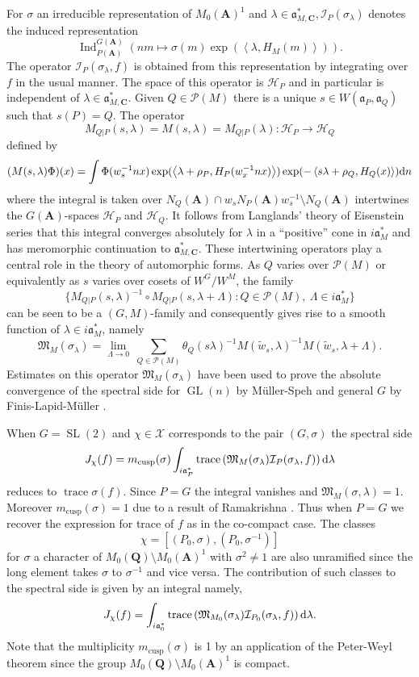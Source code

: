 \documentclass[11pt]{amsart}
\def\A{\mathbf A}
\def\C{\mathbf C}
\def\Q{\mathbf Q}
\def\HHH{\mathcal H}
\def\III{\mathcal I}
\def\MMM{\mathfrak M}	%
\def\PPP{\mathcal P}
\def\XXX{\mathcal X}
\def\aaa{\mathfrak a}
\def\cb#1{{\color{blue}#1}}
\def\d{\text d}
\def\bs{\setminus} 			%
\def\gl{\operatorname{GL}}
\def\Ind{\operatorname{Ind}}
\def\sl{\operatorname{SL}}
\def\sprod#1#2{\left\langle #1 , #2 \right\rangle}  %
\def\trace{\operatorname{trace}}
\theoremstyle{remark}
\begin{document}
For $\sigma$ an irreducible representation of $M_0(\A)^1$ and $\lambda \in \aaa_{M, \C}^*, \III_P(\sigma_\lambda)$ denotes the induced representation
\[ \Ind_{P(\A)}^{G(\A)} \left( nm \mapsto \sigma(m) \exp(\sprod{\lambda}{H_M(m)}) \right). \]
The operator $\III_P(\sigma_\lambda, f)$ is obtained from this representation by integrating over $f$ in the usual manner. The space of this operator is $\HHH_P$ and in particular is independent of $\lambda \in \aaa_{M, \C}^*$. Given $Q \in \PPP(M)$ there is a unique $s \in W(\aaa_P, \aaa_Q)$ such that $s(P) = Q$. The operator
\[ M_{Q|P}(s, \lambda) = M(s, \lambda) = M_{Q|P}(\lambda): \HHH_P \to \HHH_Q \]
defined by
\[ (M(s, \lambda)\Phi)(x) = \int \Phi(w_s^{-1}nx) \exp(\sprod{\lambda + \rho_P}{H_P(w_x^{-1}nx)}) 
		\exp(-\sprod{s\lambda + \rho_Q}{H_Q(x)}) \d n \]
where the integral is taken over $N_Q(\A) \cap w_s N_P(\A) w_s^{-1} \bs N_Q(\A)$ intertwines the $G(\A)$-spaces $\HHH_P$ and $\HHH_Q$. It follows from Langlands' theory of Eisenstein series that this integral converges absolutely for $\lambda$ in a ``positive'' cone in $i\aaa_M^*$ and has meromorphic continuation to $\aaa_{M, \C}^*$. These intertwining operators play a central role in the theory of automorphic forms. As $Q$ varies over $\PPP(M)$ or equivalently as $s$ varies over cosets of $W^G/W^M$, the family
\[ \{ M_{Q|P}(s, \lambda)^{-1} \circ M_{Q|P}(s, \lambda + \Lambda) : Q \in \PPP(M), \ \Lambda \in i\aaa_M^* \} \]
can be seen to be a $(G, M)$-family and consequently gives rise to a smooth function of $\lambda \in i\aaa_M^*$, namely
\[ \MMM_M(\sigma_\lambda) = \lim_{\Lambda \to 0} \ \sum_{Q \in \PPP(M)} \theta_Q(s\lambda)^{-1} M(\tilde w_s, \lambda)^{-1} M(\tilde w_s, \lambda + \Lambda). \]
Estimates on this operator $\MMM_M(\sigma_\lambda)$ have been used to prove the absolute convergence of the spectral side for $\gl(n)$ by M{\"u}ller-Speh \cite{MS} and general $G$ by Finis-Lapid-M{\"u}ller \cite{FLM}.

\cb{When $G = \sl(2)$ and $\chi \in \XXX$ corresponds to the pair $(G, \sigma)$ the spectral side
\[ J_\chi(f) = m_{\text{cusp}}(\sigma) \int_{i\aaa_P^*} \trace\left(\MMM_M(\sigma_\lambda) \III_P(\sigma_\lambda, f)\right) \d \lambda \]
reduces to $\trace \sigma(f)$. Since $P=G$ the integral vanishes and $\MMM_M(\sigma, \lambda) = 1$. Moreover $m_\text{cusp} (\sigma) = 1$ due to a result of Ramakrishna \cite{MR1792292}. Thus when $P=G$ we recover the expression for trace of $f$ as in the co-compact case. The classes 
\[ \chi = [(P_0, \sigma), (P_0, \sigma^{-1})] \]
for $\sigma$ a character of $M_0(\Q) \bs M_0(\A)^1$ with $\sigma^2 \neq 1$ are also unramified since the long element takes $\sigma$ to $\sigma^{-1}$ and vice versa. The contribution of such classes to the spectral side is given by an integral namely,
\[ J_\chi(f) = \int_{i\aaa_0^*} \trace\left( \MMM_{M_0}(\sigma_\lambda) \III_{P_0}(\sigma_\lambda, f) \right) \d \lambda. \]
Note that the multiplicity $m_{\text{cusp}}(\sigma)$ is 1 by an application of the Peter-Weyl theorem since the group $M_0(\Q)\bs M_0(\A)^1$ is compact. 
}
\end{document}
